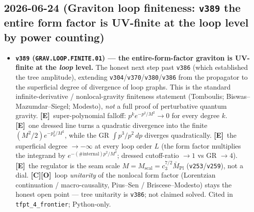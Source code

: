 \documentclass[11pt]{article}
\providecommand{\mE}{\textbf{[E]}}\providecommand{\mC}{\textbf{[C]}}
\providecommand{\mO}{\textbf{[O]}}\providecommand{\mX}{\textbf{[X]}}
\providecommand{\vref}[1]{\texttt{#1}}
\providecommand{\cthree}{c_3}\providecommand{\phiz}{\varphi_0^{\mathrm{ret}}}
\providecommand{\Mbar}{\bar M_{\mathrm{Pl}}}\providecommand{\Z}{\mathbb{Z}}\providecommand{\PP}{\mathbb{P}}
\begin{document}
\subsection*{2026-06-24 (Graviton loop finiteness: \texttt{v389} the entire form factor is UV-finite at the loop level by power counting)}
\begin{itemize}
\item \textbf{\texttt{v389} (\texttt{GRAV.LOOP.FINITE.01}) --- the entire-form-factor graviton is UV-finite at the \emph{loop} level.}
The honest next step past \vref{v386} (which established the tree amplitude), extending \vref{v304}/\vref{v370}/\vref{v380}/\vref{v386}
from the propagator to the superficial degree of divergence of loop graphs. This is the standard infinite-derivative /
nonlocal-gravity finiteness statement (Tomboulis; Biswas--Mazumdar--Siegel; Modesto), \emph{not} a full proof of
perturbative quantum gravity. \mE\ super-polynomial falloff: $p^k e^{-p^2/M^2}\to0$ for every degree $k$. \mE\ one dressed
line turns a quadratic divergence into the finite $(M^2/2)e^{-p_0^2/M^2}$, while the GR $\int p^3/p^2\,dp$ diverges
quadratically. \mE\ the superficial degree $\to-\infty$ at every loop order $L$ (the form factor multiplies the integrand by
$e^{-(\#\mathrm{internal})p^2/M^2}$; dressed cutoff-ratio $\to1$ vs GR $\to4$). \mE\ the regulator is the seam scale
$M=M_{\mathrm{scal}}=\cthree^{7/2}\Mbar$ (\vref{v253}/\vref{v259}), not a dial. \mC\mO\ loop \emph{unitarity} of the nonlocal
form factor (Lorentzian continuation / macro-causality, Pius--Sen / Briscese--Modesto) stays the honest open point --- tree
unitarity is \vref{v386}; not claimed solved. Cited in \texttt{tfpt\_4\_frontier}; Python-only.
\end{itemize}
\end{document}
